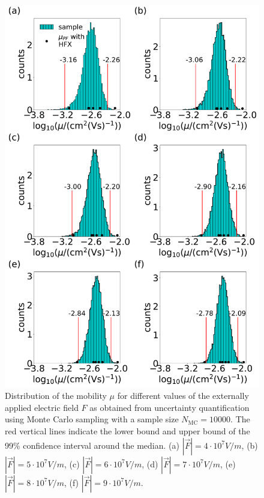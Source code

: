 \documentclass[%
 reprint,
superscriptaddress,
 amsmath,amssymb,
 aps,
prb,
floatfix
]{revtex4-2}
\begin{document}
\begin{figure}[tbp]
    \centering
    \includegraphics[width=\linewidth]{fig7.pdf}
    \caption{Distribution of the mobility $\mu$ for different values of the externally applied electric field $F$ as obtained from uncertainty quantification using 
    Monte Carlo sampling with a sample size $N_\text{MC}=10000$. The red vertical lines indicate the lower bound and upper bound of the 99\% confidence interval around the median. (a) $|\vec{F}|=4 \cdot 10^7 \unit{V/m}$, (b) $|\vec{F}|=5 \cdot 10^7 \unit{V/m}$, (c) $|\vec{F}|=6 \cdot 10^7 \unit{V/m}$, (d) $|\vec{F}|=7 \cdot 10^7 \unit{V/m}$, (e) $|\vec{F}|=8 \cdot 10^7 \unit{V/m}$, (f) $|\vec{F}|=9 \cdot 10^7 \unit{V/m}$.}
    \label{fig:fig_mle_withE_mu2_ave}
\end{figure}
\end{document}
